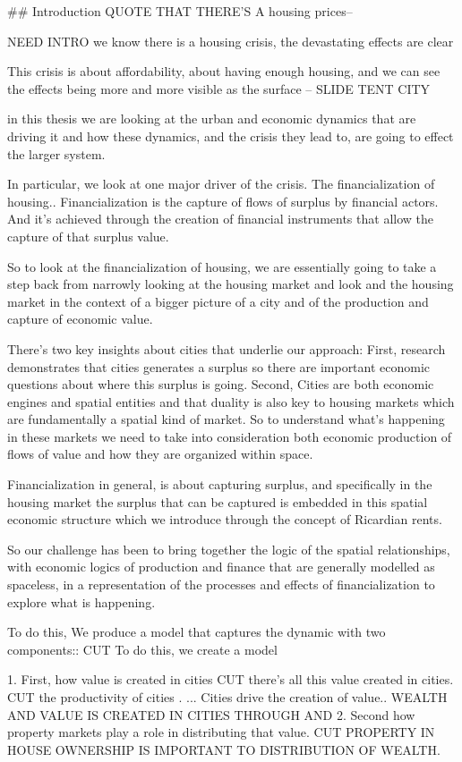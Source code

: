 
## Introduction
QUOTE THAT THERE'S A housing prices--

NEED INTRO
we know there is a housing crisis, the devastating effects are clear 

This crisis is about affordability, about having enough housing, 
and we can see the effects being more and more visible as the surface -- SLIDE TENT CITY 

in this thesis we are looking at the urban and economic dynamics that are driving it and how  these dynamics, and the  crisis they lead to, are going to effect the larger system.

In particular, we look at one major driver of the crisis. The financialization of housing.. 
Financialization is the capture of flows of surplus by financial actors. And it's achieved through the creation of financial instruments that allow the capture of that surplus value. 

So to look at the financialization of housing,  we are essentially going to take a step back from narrowly looking at the housing market and look and the housing market in the context of a bigger picture of a city and of the production and capture of economic value.

There's two key insights about cities that underlie our approach: 
First, research demonstrates that cities  generates a surplus so there are important economic questions about where this surplus is going. 
Second, Cities are both economic engines and spatial entities and that duality is also key to housing markets which are fundamentally a spatial kind of market. So to understand what's happening in these markets we need to take into consideration both economic production of flows of value and how they are organized within space. 

Financialization in general, is about capturing surplus, and specifically in the housing market the surplus that can be captured is embedded in this spatial economic structure which we introduce through the concept of Ricardian rents. 

So our challenge has been to bring together the logic of the spatial relationships,  with economic logics of production and finance that are generally modelled as spaceless,  in a representation of the processes and effects of  financialization to explore  what is happening.

To do this,  We produce a model that captures the dynamic with two components::
CUT To do this, we create a model 

 1. First, how value is created in cities CUT there's all this value created in cities.  CUT the productivity of cities . ...  Cities drive the creation of value.. WEALTH AND VALUE IS CREATED IN CITIES THROUGH AND 
 2. Second how property markets play a role in distributing that value. CUT PROPERTY IN HOUSE OWNERSHIP IS IMPORTANT TO DISTRIBUTION OF WEALTH. 


